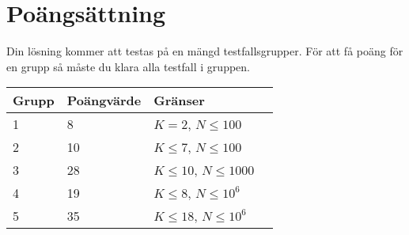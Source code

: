 \section*{Poängsättning}
Din lösning kommer att testas på en mängd testfallsgrupper. För att få poäng för en grupp
så måste du klara alla testfall i gruppen.

	\noindent
\begin{tabular}{| l | l | l | l |}
\hline
Grupp & Poängvärde & Gränser \\ \hline
	1     & 8 & $K = 2$, $N \le 100$ \\ \hline
	2     & 10 & $K \le 7$, $N \le 100$ \\ \hline
	3     & 28 & $K \le 10$, $N \le 1000$ \\ \hline
	4     & 19 & $K \le 8$, $N \le 10^6$ \\ \hline
	5     & 35 & $K \le 18$, $N \le 10^6$ \\ \hline
\end{tabular}

